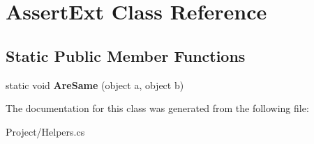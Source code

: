 \hypertarget{class_assert_ext}{}\section{Assert\+Ext Class Reference}
\label{class_assert_ext}
\subsection*{Static Public Member Functions}
\begin{DoxyCompactItemize}
\item 
\mbox{\label{class_assert_ext_a833f6605bb0e79175aa0485f3b82ccee}} 
static void {\bfseries Are\+Same} (object a, object b)
\end{DoxyCompactItemize}


The documentation for this class was generated from the following file\+:\begin{DoxyCompactItemize}
\item 
Project/Helpers.\+cs\end{DoxyCompactItemize}
